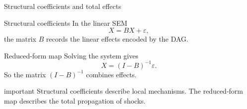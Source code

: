 \documentclass[dvipsnames,aspectratio=169,handout]{beamer}
\begin{document}
\begin{frame}{Structural coefficients and total effects}

\begin{block}{Structural coefficients}
In the linear SEM
\[
X = BX + \varepsilon,
\]
the matrix $B$ records the  linear effects encoded by the DAG.
\end{block}

\begin{block}{Reduced-form map}
Solving the system gives
\[
X = (I-B)^{-1}\varepsilon.
\]
So the matrix $(I-B)^{-1}$ combines  effects.
\end{block}


\begin{beamercolorbox}[wd=\textwidth,sep=7pt,center,rounded=true,shadow=true]{important}
Structural coefficients describe local mechanisms.  
The reduced-form map describes the total propagation of shocks.
\end{beamercolorbox}
\end{frame}
\end{document}
